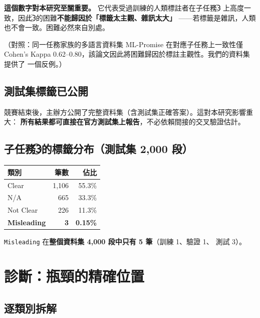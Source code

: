 \documentclass[11pt,a4paper]{ctexart}
\newcommand{\fieldname}[1]{\texttt{#1}}
\begin{document}
\begin{tcolorbox}[colback=yellow!8, colframe=orange!60]
\textbf{這個數字對本研究至關重要。} 它代表受過訓練的人類標註者在子任務\textcircled{3}
上高度一致，因此\textcircled{3}的困難\textbf{不能歸因於「標籤太主觀、雜訊太大」}
——若標籤是雜訊，人類也不會一致。困難必然來自別處。

（對照：同一任務家族的多語言資料集 ML-Promise 在對應子任務上一致性僅
Cohen's Kappa 0.62--0.80，該論文因此將困難歸因於標註主觀性。我們的資料集提供了
一個反例。）
\end{tcolorbox}

\subsection{測試集標籤已公開}

競賽結束後，主辦方公開了完整資料集（含測試集正確答案）。這對本研究影響重大：
\textbf{所有結果都可直接在官方測試集上報告}，不必依賴間接的交叉驗證估計。

\subsection{子任務\textcircled{3}的標籤分布（測試集 2{,}000 段）}

\begin{table}[h]
\centering
\small
\begin{tabular}{@{}lrr@{}}
\toprule
類別 & 筆數 & 佔比 \\
\midrule
Clear      & 1{,}106 & 55.3\% \\
N/A        & 665     & 33.3\% \\
Not Clear  & 226     & 11.3\% \\
\rowcolor{red!10}
\textbf{Misleading} & \textbf{3} & \textbf{0.15\%} \\
\bottomrule
\end{tabular}
\end{table}

\fieldname{Misleading} 在\textbf{整個資料集 4{,}000 段中只有 5 筆}（訓練 1、驗證 1、
測試 3）。

\section{診斷：瓶頸的精確位置}

\subsection{逐類別拆解}
\end{document}
